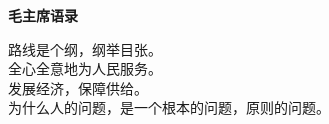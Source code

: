 \begin{center}
\huge
{\bfseries
毛主席语录
}
\end{center}
\vspace{1.5\baselineskip}

\Large
路线是个纲，纲举目张。\\

全心全意地为人民服务。\\

发展经济，保障供给。\\

为什么人的问题，是一个根本的问题，原则的问题。\\
